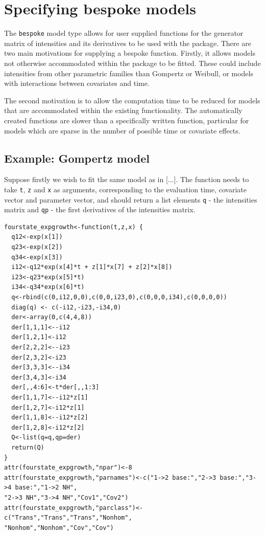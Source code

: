 \documentclass{article}
\numberwithin{equation}{section}
\begin{document}
\section{Specifying bespoke models}

The \verb!bespoke! model type allows for user supplied functions for the generator matrix of intensities and its derivatives to be used with the package. There are two main motivations for supplying a bespoke function.
Firstly, it allows models not otherwise accommodated within the package to be fitted. These could include intensities from other parametric families than Gompertz or Weibull, or models with interactions between covariates and time.

The second motivation is to allow the computation time to be reduced for models that are accommodated within the existing functionality. The automatically created functions are slower than a specifically written function, particular for models which are sparse in the number of possible time or covariate effects.

\subsection{Example: Gompertz model}

Suppose firstly we wish to fit the same model as in [...]. The function needs to take \verb!t!, \verb!z! and \verb!x! as arguments, corresponding to the evaluation time, covariate vector and parameter vector, and should return a list elements \verb!q! - the intensities matrix and  \verb!qp! - the first derivatives of the intensities matrix.

\begin{verbatim}
fourstate_expgrowth<-function(t,z,x) {
  q12<-exp(x[1])
  q23<-exp(x[2])
  q34<-exp(x[3])
  i12<-q12*exp(x[4]*t + z[1]*x[7] + z[2]*x[8])
  i23<-q23*exp(x[5]*t)
  i34<-q34*exp(x[6]*t)
  q<-rbind(c(0,i12,0,0),c(0,0,i23,0),c(0,0,0,i34),c(0,0,0,0))
  diag(q) <- c(-i12,-i23,-i34,0)
  der<-array(0,c(4,4,8))
  der[1,1,1]<--i12
  der[1,2,1]<-i12
  der[2,2,2]<--i23
  der[2,3,2]<-i23
  der[3,3,3]<--i34
  der[3,4,3]<-i34
  der[,,4:6]<-t*der[,,1:3]
  der[1,1,7]<--i12*z[1]
  der[1,2,7]<-i12*z[1]
  der[1,1,8]<--i12*z[2]
  der[1,2,8]<-i12*z[2]
  Q<-list(q=q,qp=der)
  return(Q)
}
attr(fourstate_expgrowth,"npar")<-8
attr(fourstate_expgrowth,"parnames")<-c("1->2 base:","2->3 base:","3->4 base:","1->2 NH",
"2->3 NH","3->4 NH","Cov1","Cov2")
attr(fourstate_expgrowth,"parclass")<-c("Trans","Trans","Trans","Nonhom",
"Nonhom","Nonhom","Cov","Cov")
\end{verbatim}
\end{document}
